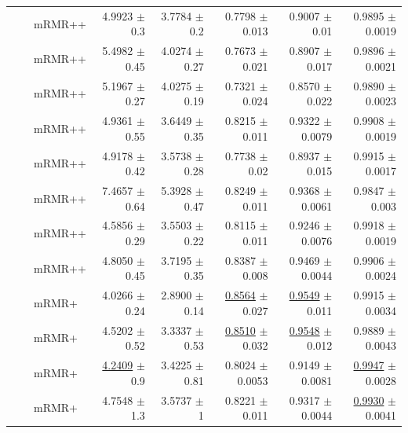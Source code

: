 \begin{longtable}{llp{}rrrrr}
 &  & mRMR++ & 4.9923 {\scriptsize $\pm$ 0.3} & 3.7784 {\scriptsize $\pm$ 0.2} & 0.7798 {\scriptsize $\pm$ 0.013} & 0.9007 {\scriptsize $\pm$ 0.01} & 0.9895 {\scriptsize $\pm$ 0.0019} \\
 &  & mRMR++ & 5.4982 {\scriptsize $\pm$ 0.45} & 4.0274 {\scriptsize $\pm$ 0.27} & 0.7673 {\scriptsize $\pm$ 0.021} & 0.8907 {\scriptsize $\pm$ 0.017} & 0.9896 {\scriptsize $\pm$ 0.0021} \\
 &  & mRMR++ & 5.1967 {\scriptsize $\pm$ 0.27} & 4.0275 {\scriptsize $\pm$ 0.19} & 0.7321 {\scriptsize $\pm$ 0.024} & 0.8570 {\scriptsize $\pm$ 0.022} & 0.9890 {\scriptsize $\pm$ 0.0023} \\
 &  & mRMR++ & 4.9361 {\scriptsize $\pm$ 0.55} & 3.6449 {\scriptsize $\pm$ 0.35} & 0.8215 {\scriptsize $\pm$ 0.011} & 0.9322 {\scriptsize $\pm$ 0.0079} & 0.9908 {\scriptsize $\pm$ 0.0019} \\
 &  & mRMR++ & 4.9178 {\scriptsize $\pm$ 0.42} & 3.5738 {\scriptsize $\pm$ 0.28} & 0.7738 {\scriptsize $\pm$ 0.02} & 0.8937 {\scriptsize $\pm$ 0.015} & 0.9915 {\scriptsize $\pm$ 0.0017} \\
 &  & mRMR++ & 7.4657 {\scriptsize $\pm$ 0.64} & 5.3928 {\scriptsize $\pm$ 0.47} & 0.8249 {\scriptsize $\pm$ 0.011} & 0.9368 {\scriptsize $\pm$ 0.0061} & 0.9847 {\scriptsize $\pm$ 0.003} \\
 &  & mRMR++ & 4.5856 {\scriptsize $\pm$ 0.29} & 3.5503 {\scriptsize $\pm$ 0.22} & 0.8115 {\scriptsize $\pm$ 0.011} & 0.9246 {\scriptsize $\pm$ 0.0076} & 0.9918 {\scriptsize $\pm$ 0.0019} \\
 &  & mRMR++ & 4.8050 {\scriptsize $\pm$ 0.45} & 3.7195 {\scriptsize $\pm$ 0.35} & 0.8387 {\scriptsize $\pm$ 0.008} & 0.9469 {\scriptsize $\pm$ 0.0044} & 0.9906 {\scriptsize $\pm$ 0.0024} \\
 &  & mRMR+ & 4.0266 {\scriptsize $\pm$ 0.24} & 2.8900 {\scriptsize $\pm$ 0.14} & \underline{0.8564} {\scriptsize $\pm$ 0.027} & \underline{0.9549} {\scriptsize $\pm$ 0.011} & 0.9915 {\scriptsize $\pm$ 0.0034} \\
 &  & mRMR+ & 4.5202 {\scriptsize $\pm$ 0.52} & 3.3337 {\scriptsize $\pm$ 0.53} & \underline{0.8510} {\scriptsize $\pm$ 0.032} & \underline{0.9548} {\scriptsize $\pm$ 0.012} & 0.9889 {\scriptsize $\pm$ 0.0043} \\
 &  & mRMR+ & \underline{4.2409} {\scriptsize $\pm$ 0.9} & 3.4225 {\scriptsize $\pm$ 0.81} & 0.8024 {\scriptsize $\pm$ 0.0053} & 0.9149 {\scriptsize $\pm$ 0.0081} & \underline{0.9947} {\scriptsize $\pm$ 0.0028} \\
 &  & mRMR+ & 4.7548 {\scriptsize $\pm$ 1.3} & 3.5737 {\scriptsize $\pm$ 1} & 0.8221 {\scriptsize $\pm$ 0.011} & 0.9317 {\scriptsize $\pm$ 0.0044} & \underline{0.9930} {\scriptsize $\pm$ 0.0041} \\

\end{longtable}
